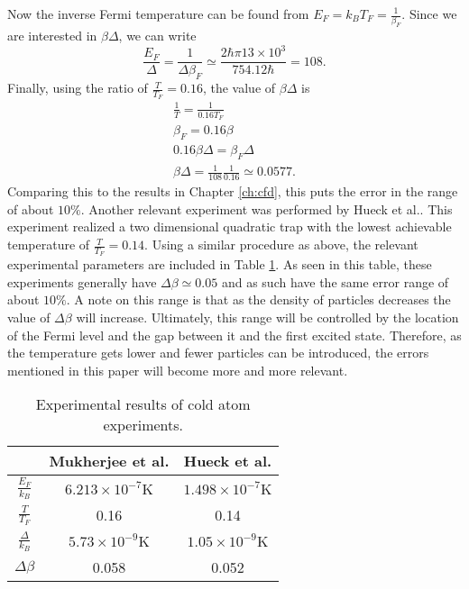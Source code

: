 Now the inverse Fermi temperature can be found from $E_F=k_B T_F=\frac{1}{\beta_F}$. Since we are interested in $\beta\Delta$, we can write
\begin{equation*}
    \frac{E_F}{\Delta}=\frac{1}{\Delta \beta_F}\simeq \frac{2\hbar \pi 13\times 10^3}{754.12\hbar}=108.
\end{equation*}
Finally, using the ratio of $\frac{T}{T_F}=0.16$, the value of $\beta\Delta$ is
\begin{align*}
    \frac{1}{T}=\frac{1}{0.16 T_F}\\
    \beta_F=0.16\beta\\
    0.16\beta\Delta=\beta_F\Delta\\
    \beta\Delta=\frac{1}{108}\frac{1}{0.16}\simeq 0.0577.
\end{align*}
Comparing this to the results in Chapter \ref{ch:cfd}, this puts the error in the range of about $10\%$. Another relevant experiment was performed by Hueck et al.\@ \cite{Hueck2018}. This experiment realized a two dimensional quadratic trap with the lowest achievable temperature of $\frac{T}{T_F}=0.14$. Using a similar procedure as above, the relevant experimental parameters are included in Table \ref{tab:experiment}. As seen in this table, these experiments generally have $\Delta\beta \simeq 0.05$ and as such have the same error range of about $10\%$. A note on this range is that as the density of particles decreases the value of $\Delta\beta$ will increase. Ultimately, this range will be controlled by the location of the Fermi level and the gap between it and the first excited state. Therefore, as the temperature gets lower and fewer particles can be introduced, the errors mentioned in this paper will become more and more relevant. 

\begin{table}[H]
    \centering
    \begin{tabular}{||c c c||}
           \hline
         & Mukherjee et al.\@ \cite{Mukherjee2017} & Hueck et al.\@ \cite{Hueck2018} \\ [0.5ex]
         \hline
         $\frac{E_F}{k_B}$ & $6.213\times10^{-7}$K & $1.498\times10^{-7}$K\\ 
         \hline
         $\frac{T}{T_F}$ & 0.16 & 0.14 \\
         \hline
         $\frac{\Delta}{k_B}$ & $5.73\times 10^{-9}$K & $1.05\times 10^{-9}$K\\
         \hline
         $\Delta\beta$ & 0.058 & 0.052 \\ [1ex]
         \hline
    \end{tabular}
    \caption{Experimental results of cold atom experiments.}
    \label{tab:experiment}
\end{table}

